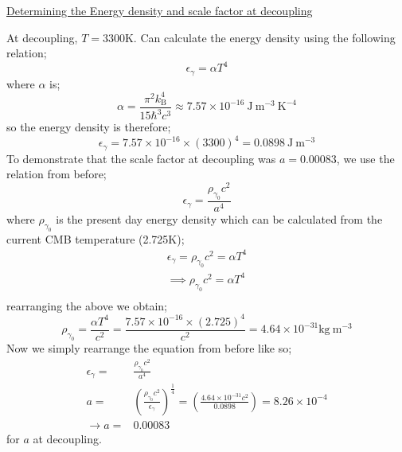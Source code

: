 \documentclass[11pt, a4paper, answers]{exam}
\begin{document}
\begin{questions}
\begin{solution}
        \underline{Determining the Energy density and scale factor at decoupling}

        At decoupling, $T = $3300K. Can calculate the energy density using the following relation;
        \begin{equation*}
            \epsilon_{\gamma} = \alpha T^4
        \end{equation*}
        where $\alpha$ is;
        \begin{equation*}
            \alpha = \frac{\pi^2k^4_{\text{B}}}{15\hbar^3c^3} \approx 7.57\times 10^{-16} \: \text{J}
            \: \text{m}^{-3} \: \text{K}^{-4}
        \end{equation*}
        so the energy density is therefore;
        \begin{equation*}
            \epsilon_{\gamma} = 7.57\times 10^{-16} \times (3300)^4  = 0.0898 \: \text{J}
            \: \text{m}^{-3}
        \end{equation*}
        To demonstrate that the scale factor at decoupling was $a = 0.00083$, we use the
        relation from before;
        \begin{equation*}
            \epsilon_{\gamma} = \frac{\rho_{\gamma_{0}}c^2}{a^4}
        \end{equation*}
        where $\rho_{\gamma_{0}}$ is the present day energy density which can be calculated from the
        current CMB temperature (2.725K);
        \begin{align*}
            \epsilon_{\gamma} = \rho_{\gamma_{0}}c^2 = \alpha T^4 \\
            \implies \rho_{\gamma_{0}}c^2 = \alpha T^4            \\
        \end{align*}
        rearranging the above we obtain;
        \begin{equation*}
            \rho_{\gamma_{0}} = \frac{\alpha T^4}{c^2} =
            \frac{7.57\times 10^{-16} \times (2.725)^4}{c^2} = 4.64 \times 10^{-31} \text{kg} \:
            \text{m}^{-3}
        \end{equation*}
        Now we simply rearrange the equation from before like so;
        \begin{align*}
            \epsilon_{\gamma} = & \frac{\rho_{\gamma_{0}}c^2}{a^4} \\
            a =                 & \left(
            \frac{\rho_{\gamma_{0}} c^2}{\epsilon_{\gamma}}
            \right)^{\frac{1}{4}} = \left(
            \frac{4.64\times 10^{-31} c^2}{0.0898}
            \right) = 8.26 \times 10^{-4}                          \\
            \to a =             & 0.00083
        \end{align*}
        for $a$ at decoupling.
    \end{solution}


\end{questions}
\end{document}
